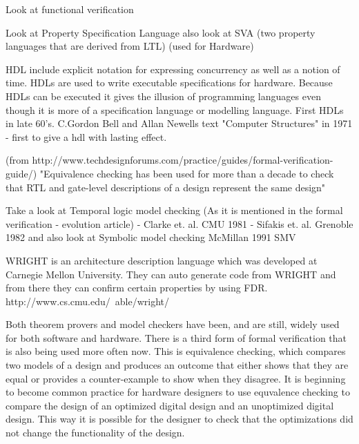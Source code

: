 Look at functional verification

Look at Property Specification Language
also look at SVA (two property languages that are derived from LTL) (used for Hardware)


HDL include explicit notation for expressing concurrency as well as a notion of time.
HDLs are used to write executable specifications for hardware.
Because HDLs can be executed it gives the illusion of programming languages even though it is more of a specification language or modelling language.
First HDLs in late 60's. C.Gordon Bell and Allan Newells text "Computer Structures" in 1971 - first to give a hdl with lasting effect.

(from
http://www.techdesignforums.com/practice/guides/formal-verification-guide/) "Equivalence checking has been used for more than a decade to check that RTL and gate-level descriptions of a design represent the same design"



Take a look at Temporal logic model checking (As it is mentioned in the formal verification - evolution article)
- Clarke et. al. CMU 1981
- Sifakis et. al. Grenoble 1982
and also look at
Symbolic model checking
McMillan 1991
SMV

WRIGHT\cite{Allen1997}\cite{Allen1997a} 
is an architecture description language which was developed at Carnegie Mellon University. They can auto generate \cspm code from WRIGHT and from there they can confirm certain properties by using FDR. http://www.cs.cmu.edu/~able/wright/



Both theorem provers and model checkers have been, and are still, widely used for both software and hardware. There is a third form of formal verification that is also being used more often now. This is equivalence checking, which compares two models of a design and produces an outcome that either shows that they are equal or provides a counter-example to show when they disagree. It is beginning to become common practice for hardware designers to use equvalence checking to compare the design of an optimized digital design and an unoptimized digital design. This way it is possible for the designer to check that the optimizations did not change the functionality of the design.

